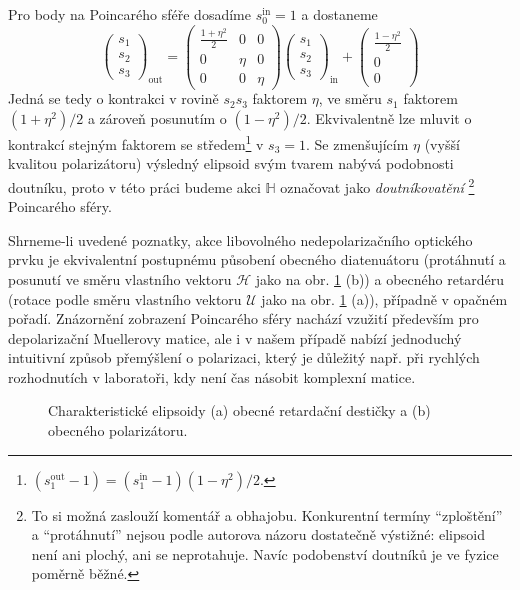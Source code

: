 Pro body na Poincarého sféře dosadíme $s_0^\textrm{in}=1$ a dostaneme
\begin{equation}
    \begin{pmatrix} s_1 \\ s_2 \\ s_3 \end{pmatrix}_{\textrm{out}}
    =\begin{pmatrix} \frac{1+\eta^2}{2} & 0 & 0 \\ 0 & \eta & 0 \\ 0 & 0 & \eta \end{pmatrix}
    \begin{pmatrix} s_1 \\ s_2 \\ s_3  \end{pmatrix}_{\textrm{in}}
    +\begin{pmatrix} \frac{1-\eta^2}{2} \\ 0 \\ 0 \end{pmatrix}
\end{equation}
Jedná se tedy o kontrakci v rovině $s_2s_3$ faktorem $\eta$, ve směru $s_1$ faktorem $(1+\eta^2)/2$ a zároveň posunutím o $(1-\eta^2)/2$.
Ekvivalentně lze mluvit o kontrakcí stejným faktorem se středem\footnote{$(s_1^\textrm{out}-1)=(s_1^\textrm{in}-1)(1-\eta^2)/2$.} v $s_3=1$.
Se zmenšujícím $\eta$ (vyšší kvalitou polarizátoru) výsledný elipsoid svým tvarem nabývá podobnosti doutníku, proto v této práci budeme akci $\mathbb{H}$ označovat jako \emph{doutníkovatění}
\footnote{To si možná zaslouží komentář a obhajobu. Konkurentní termíny ``zploštění'' a ``protáhnutí'' nejsou podle autorova názoru dostatečně výstižné: elipsoid není ani plochý, ani se neprotahuje. Navíc podobenství doutníků je ve fyzice poměrně běžné\cite{liEstimatesEigenvaluesBidrifting2019,middelkampDynamicsDarkBright2011}.}
Poincarého sféry.

Shrneme-li uvedené poznatky, akce libovolného nedepolarizačního optického prvku je ekvivalentní postupnému působení obecného diatenuátoru (protáhnutí a posunutí ve směru vlastního vektoru $\mathcal{H}$ jako na obr. \ref{fig:UH-Mueller} (b)) a obecného retardéru (rotace podle směru vlastního vektoru $\mathcal{U}$ jako na obr. \ref{fig:UH-Mueller} (a)), případně v opačném pořadí.
Znázornění zobrazení Poincarého sféry nachází vzužití především pro depolarizační Muellerovy matice, ale i v našem případě nabízí jednoduchý intuitivní způsob přemýšlení o polarizaci, který je důležitý např. při rychlých rozhodnutích v laboratoři, kdy není čas násobit komplexní matice.

\begin{figure}[htbp]
    \centering
    \caption{Charakteristické elipsoidy (a) obecné retardační destičky a (b) obecného polarizátoru.}
    \label{fig:UH-Mueller}
\end{figure}

